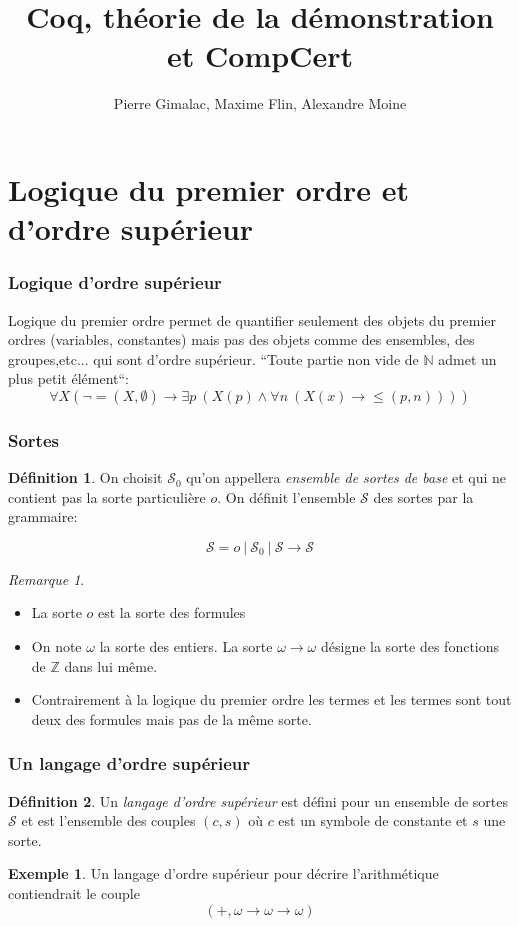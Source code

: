 \documentclass[11pt,a4paper]{beamer}
\title{Coq, théorie de la démonstration et CompCert}
\author{Pierre Gimalac, Maxime Flin, Alexandre Moine}
\theoremstyle{plain}
\theoremstyle{definition}
\newtheorem{defn}{Définition}[section]
\newtheorem{exmp}{Exemple}[section]
\theoremstyle{remark}
\newtheorem*{rem}{Remarque}
\begin{document}
\maketitle

\section{Logique du premier ordre et d'ordre supérieur}
\begin{frame}
\frametitle{Logique d'ordre supérieur}
Logique du premier ordre permet de quantifier seulement des objets du premier ordres (variables, constantes) mais pas des objets comme des ensembles, des groupes,etc... qui sont d'ordre supérieur.
\newline
\newline
``Toute partie non vide de $\mathbb{N}$ admet un plus petit élément``:
\[ \forall X \left(\neg =(X, \emptyset)\rightarrow\exists p~(X(p)\wedge\forall n~(X(x)\rightarrow \leq(p, n)))\right)\]
\end{frame}

\begin{frame}
\frametitle{Sortes}
\begin{defn}
On choisit $\mathcal{S}_0$ qu'on appellera \textit{ensemble de sortes de base} et qui ne contient pas la sorte particulière $o$. On définit l'ensemble $\mathcal{S}$ des sortes par la grammaire:

\[ \mathcal{S} = o~|~\mathcal{S}_0~|~\mathcal{S}\rightarrow\mathcal{S} \]
\end{defn}

\begin{rem}
\begin{itemize}
\item La sorte $o$ est la sorte des formules
\item On note $\omega$ la sorte des entiers. La sorte $\omega \rightarrow \omega$ désigne la sorte des fonctions de $\mathbb{Z}$ dans lui même.
\item Contrairement à la logique du premier ordre les termes et les termes sont tout deux des formules mais pas de la même sorte.
\end{itemize}
\end{rem}
\end{frame}

\begin{frame}
\frametitle{Un langage d'ordre supérieur}
\begin{defn}
Un \textit{langage d'ordre supérieur} est défini pour un ensemble de sortes $\mathcal{S}$ et est l'ensemble des couples $(c,s)$ où $c$ est un symbole de constante et $s$ une sorte.
\end{defn}

\begin{exmp}
Un langage d'ordre supérieur pour décrire l'arithmétique contiendrait le couple
\[ \left(+, \omega \rightarrow \omega \rightarrow \omega\right) \]
\end{exmp}
\end{frame}
\end{document}
